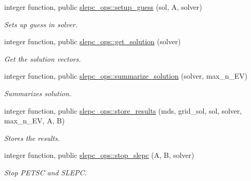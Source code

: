 \begin{DoxyCompactItemize}
integer function, public \hyperlink{namespaceslepc__ops_a17a57b58ac6ca48ff4bdb44e8689bb19}{slepc\+\_\+ops\+::setup\+\_\+guess} (sol, A, solver)
\begin{DoxyCompactList}\small\item\em Sets up guess in solver. \end{DoxyCompactList}\item 
integer function, public \hyperlink{namespaceslepc__ops_aabe2aef90f039316bf3f03e651a6e7e0}{slepc\+\_\+ops\+::get\+\_\+solution} (solver)
\begin{DoxyCompactList}\small\item\em Get the solution vectors. \end{DoxyCompactList}\item 
integer function, public \hyperlink{namespaceslepc__ops_a03193dbc55e7061891d58e96a2bf1dd5}{slepc\+\_\+ops\+::summarize\+\_\+solution} (solver, max\+\_\+n\+\_\+\+EV)
\begin{DoxyCompactList}\small\item\em Summarizes solution. \end{DoxyCompactList}\item 
integer function, public \hyperlink{namespaceslepc__ops_a24d97496000ed55f1d11e4d436e084a6}{slepc\+\_\+ops\+::store\+\_\+results} (mds, grid\+\_\+sol, sol, solver, max\+\_\+n\+\_\+\+EV, A, B)
\begin{DoxyCompactList}\small\item\em Stores the results. \end{DoxyCompactList}\item 
integer function, public \hyperlink{namespaceslepc__ops_aeeac6908b3988f395314e7769829a058}{slepc\+\_\+ops\+::stop\+\_\+slepc} (A, B, solver)
\begin{DoxyCompactList}\small\item\em Stop P\+E\+T\+SC and S\+L\+E\+PC. \end{DoxyCompactList}\end{DoxyCompactItemize}
